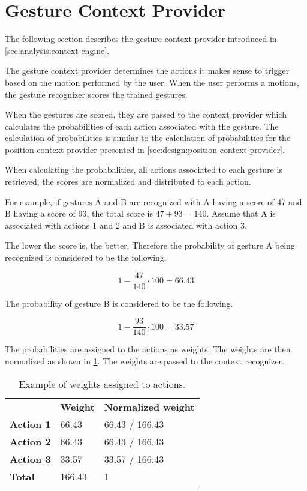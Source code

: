 \section{Gesture Context Provider}
\label{sec:design:gesture-context-provider}

The following section describes the gesture context provider introduced in \cref{sec:analysis:context-engine}.

The gesture context provider determines the actions it makes sense to trigger based on the motion performed by the user. When the user performs a motions, the gesture recognizer scores the trained gestures.

When the gestures are scored, they are passed to the context provider which calculates the probabilities of each action associated with the gesture. The calculation of probabilities is similar to the calculation of probabilities for the position context provider presented in \cref{sec:design:position-context-provider}.

When calculating the probabalities, all actions associated to each gesture is retrieved, the scores are normalized and distributed to each action.

For example, if gestures A and B are recognized with A having a score of 47 and B having a score of 93, the total score is $47 + 93 = 140$. Assume that A is associated with actions 1 and 2 and B is associated with action 3.

The lower the score is, the better. Therefore the probability of gesture A being recognized is considered to be the following.

\begin{equation*}
1 - \frac{47}{140} \cdot 100 = 66.43
\end{equation*}

The probability of gesture B is considered to be the following.

\begin{equation*}
1 - \frac{93}{140} \cdot 100 = 33.57
\end{equation*}

The probabilities are assigned to the actions as weights. The weights are then normalized as shown in \cref{tbl:sec:design:gesture-context-provider:weighted-actions}. The weights are passed to the context recognizer.

\begin{table}[h!]
\centering
\caption{Example of weights assigned to actions.}
\label{tbl:sec:design:gesture-context-provider:weighted-actions}
\begin{tabular}{lll}
                  & \textbf{Weight} & \textbf{Normalized weight} \\
\textbf{Action 1} & 66.43           & 66.43 / 166.43             \\
\textbf{Action 2} & 66.43           & 66.43 / 166.43             \\
\textbf{Action 3} & 33.57           & 33.57 / 166.43             \\
\textbf{Total}    & 166.43          & 1                         
\end{tabular}
\end{table}

